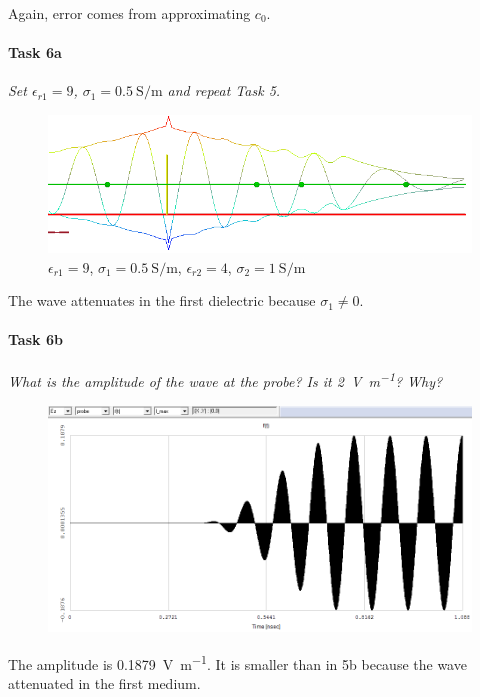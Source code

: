 Again, error comes from approximating $c_0$.

\paragraph{Task 6a} \textit{Set $\epsilon_{r1} = 9$, $\sigma_1 = \SI{0.5}{\siemens\per\meter}$ and repeat Task 5.}
\begin{figure}[tbph]
	\centering
	\includegraphics[width=0.96\linewidth]{graphics/Task2-6a-Standing}
	\caption{$\epsilon_{r1} = 9$, $\sigma_1 = \SI{0.5}{\siemens\per\meter}$, $\epsilon_{r2} = 4$, $\sigma_2 = \SI{1}{\siemens\per\meter}$}
	\label{fig:Task2-6a-Standing}
\end{figure}

The wave attenuates in the first dielectric because $\sigma_1 \ne 0$.

\pagebreak
\paragraph{Task 6b} \textit{What is the amplitude of the wave at the probe? Is it \SI{2}{\volt\per\meter}? Why?}
\begin{figure}[tbph]
	\centering
	\includegraphics[width=0.6\linewidth]{graphics/Task2-6b-Amplitude}
\end{figure}

The amplitude is \SI{0.1879}{\volt\per\meter}.
It is smaller than in 5b because the wave attenuated in the first medium.

